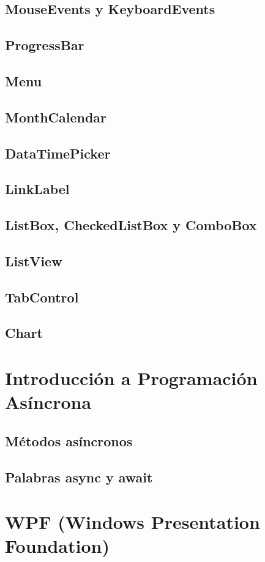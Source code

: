 \documentclass[12pt,a4paper]{report}
\begin{document}
\section{MouseEvents y KeyboardEvents}
\section{ProgressBar}
\section{Menu}
\section{MonthCalendar}
\section{DataTimePicker}
\section{LinkLabel}
\section{ListBox, CheckedListBox y ComboBox}
\section{ListView}
\section{TabControl}
\section{Chart}

\chapter{Introducción a Programación Asíncrona}
\section{Métodos asíncronos}
\section{Palabras async y await}

\chapter{WPF (Windows Presentation Foundation)}
\end{document}
